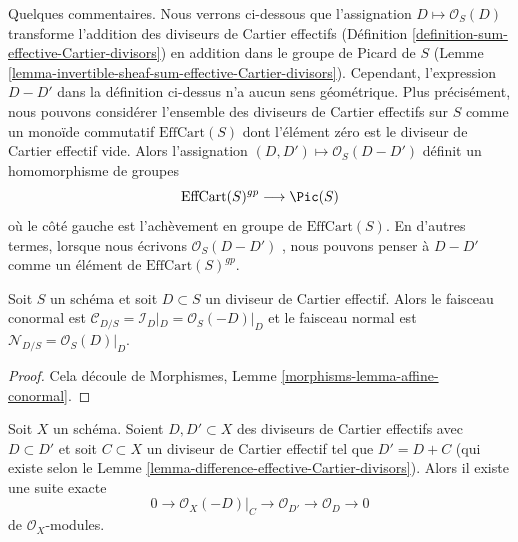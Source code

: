 \noindent
Quelques commentaires. Nous verrons ci-dessous que l'assignation  $D \mapsto \mathcal{O}_S(D)$ 
transforme l'addition des diviseurs de Cartier effectifs (Définition  \ref{definition-sum-effective-Cartier-divisors})
en addition dans le groupe de Picard de  $S$  (Lemme  \ref{lemma-invertible-sheaf-sum-effective-Cartier-divisors}).
Cependant, l'expression  $D - D'$  dans la définition ci-dessus n'a aucun sens
géométrique. Plus précisément, nous pouvons considérer l'ensemble des diviseurs de
Cartier effectifs sur  $S$  comme un monoïde commutatif  $\text{EffCart}(S)$  dont
l'élément zéro est le diviseur de Cartier effectif vide. Alors l'assignation
 $(D, D') \mapsto \mathcal{O}_S(D - D')$  définit un homomorphisme de groupes
$$
\text{EffCart}(S)^{gp} \longrightarrow \Pic(S)
$$
où le côté gauche est l'achèvement en groupe de  $\text{EffCart}(S)$. En d'autres termes,
lorsque nous écrivons  $\mathcal{O}_S(D - D')$ , nous pouvons penser à  $D - D'$  comme un
élément de  $\text{EffCart}(S)^{gp}$.

\begin{lemma}
\label{lemma-conormal-effective-Cartier-divisor}
Soit  $S$  un schéma et soit  $D \subset S$  un diviseur de Cartier effectif.
Alors le faisceau conormal est  $\mathcal{C}_{D/S} = \mathcal{I}_D|_D =
\mathcal{O}_S(-D)|_D$  et le faisceau normal est
 $\mathcal{N}_{D/S} = \mathcal{O}_S(D)|_D$.
\end{lemma}

\begin{proof}
Cela découle de Morphismes, Lemme  \ref{morphisms-lemma-affine-conormal}.
\end{proof}

\begin{lemma}
\label{lemma-ses-add-divisor}
Soit  $X$  un schéma. Soient  $D, D' \subset X$  des diviseurs de Cartier
effectifs avec  $D \subset D'$  et soit  $C \subset X$  un diviseur de Cartier effectif
tel que  $D' = D + C$  (qui existe selon le Lemme  \ref{lemma-difference-effective-Cartier-divisors}). Alors il existe une
suite exacte
$$
0 \to \mathcal{O}_X(-D)|_C \to \mathcal{O}_{D'} \to \mathcal{O}_D \to 0
$$
de  $\mathcal{O}_X$-modules.
\end{lemma}

